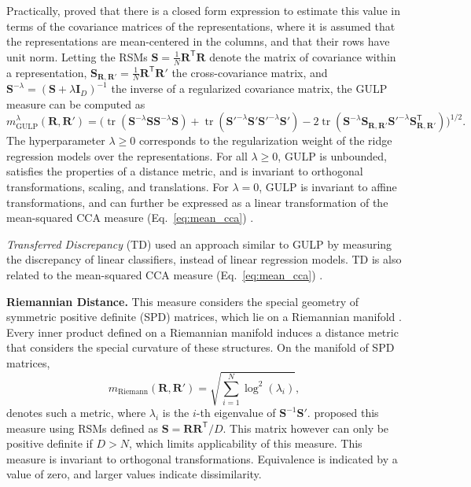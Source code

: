 \documentclass{article}
\newcommand{\citet}{\textcite}
\newcommand{\R}{\bm{R}}
\newcommand{\Rp}{\bm{R'}}
\newcommand{\Sm}{\bm{S}}
\newcommand{\Smp}{\bm{S'}}
\newcommand{\transp}{\mathsf{T}}
\newcommand{\tr}{\operatorname{tr}}
\newcommand\myeqref[1]{%
    (\textup{Eq.~\ref{#1}})%
}
\newcommand{\subheader}{\textbf}
\begin{document}
Practically, \citet{boix-adsera_gulp_2022} proved that there is a closed form expression to estimate this value in terms of the covariance matrices of the representations, where it is assumed that the representations are mean-centered in the columns, and that their rows have unit norm.
Letting the RSMs $\Sm=\frac{1}{N}\R^\transp \R$ denote the matrix of covariance within a representation, $\bm{S_{\R,\Rp}}=\frac{1}{N}\R^\transp \Rp$ the cross-covariance matrix, and $\Sm^{-\lambda}= (\Sm + \lambda\bm{I}_D)^{-1}$ the inverse of a regularized covariance matrix, the GULP measure can be computed as
\begin{equation}\label{eq:gulp}
    m_{\operatorname{GULP}}^\lambda(\R,\Rp) = \Big(\tr(\Sm^{-\lambda}\Sm \Sm^{-\lambda}\Sm)
    + \tr(\Smp^{-\lambda}\Smp \Smp^{-\lambda}\Smp)
    - 2 \tr(\Sm^{-\lambda} \Sm_{\R,\Rp} \Smp^{-\lambda} \Sm_{\R,\Rp}^\transp)\Big)^{1/2}.
\end{equation}
The hyperparameter $\lambda\geq 0$ corresponds to the regularization weight of the ridge regression models over the representations.
For all $\lambda\geq 0$, GULP is unbounded, satisfies the properties of a distance metric, and is invariant to orthogonal transformations, scaling, and translations.
For $\lambda = 0$, GULP is invariant to affine transformations, and can further be expressed as a linear transformation of the mean-squared CCA measure \myeqref{eq:mean_cca}.

\emph{Transferred Discrepancy} (TD) \cite{feng_transferred_2020} used an approach similar to GULP by measuring the discrepancy of linear classifiers, instead of linear regression models.
TD is also related to the mean-squared CCA measure \myeqref{eq:mean_cca}.


\subheader{Riemannian Distance.}
This measure considers the special geometry of symmetric positive definite (SPD) matrices, which lie on a Riemannian manifold \cite{bhatia_positive_2007}.
Every inner product defined on a Riemannian manifold induces a distance metric that considers the special curvature of these structures.
On the manifold of SPD matrices,
\begin{equation}\label{eq:riemann}
    m_{\operatorname{Riemann}}(\R, \Rp) = \sqrt{\textstyle\sum_{i=1}^N \log^2(\lambda_i)},
\end{equation}
denotes such a metric, where $\lambda_i$ is the $i$-th eigenvalue of $\Sm^{-1}\Smp$.
\citet{shahbazi_using_2021} proposed this measure using RSMs defined as $\Sm=\R\R^\transp/D$.
This matrix however can only be positive definite if $D>N$, which limits applicability of this measure.
This measure is invariant to orthogonal transformations.
Equivalence is indicated by a value of zero, and larger values indicate dissimilarity.
\end{document}
